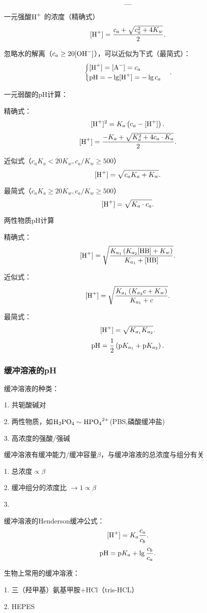 \[
    \ldots
.\] 
\begin{notation}
    一元强酸$\ce{H+}$ 的浓度（精确式）
    \[
        [\ce{H+}]=\frac{c_a+\sqrt{c_a^2+4K_w} }{2}
    .\] 

    忽略水的解离（$c_a\ge 20[\ce{OH-}]$），可以近似为下式（最简式）：
    \[
        \begin{cases}
            [\ce{H+}]=[\ce{A-}]=c_a\\
            \ce{pH}=-\lg [\ce{H+}]=-\lg c_a
        \end{cases}
    .\] 
\end{notation}
\begin{notation}
    一元弱酸的pH计算：

    精确式：\[
        [\ce{H+}]^2 = K_a\left( c_a-[\ce{H+}] \right) 
    .\] 
    \[
        [\ce{H+}]=\frac{-K_a+\sqrt{K_a^2+4c_a\cdot K_a} }{2}
    .\]

    近似式（$c_aK_a<20K_w, c_a/K_w\ge 500$）
    \[
        [\ce{H+}]=\sqrt{c_aK_a+K_w} 
    .\]

    最简式（$c_aK_a\ge 20K_w, c_a/K_w\ge 500$）
    \[
        [\ce{H+}]=\sqrt{K_a\cdot c_a} 
    .\] 
\end{notation}
\begin{notation}
    两性物质pH计算

    精确式：
    \[
        [\ce{H+}]=\sqrt{\frac{K_{a_1}\left( K_{a_2}[\ce{HB}]+K_w \right) }{K_{a_1}+[\ce{HB}]}} 
    .\] 
    
    近似式：
    \[
        [\ce{H+}]=\sqrt{\frac{K_{a_1}\left( K_{a_2}c+K_w \right) }{K_{a_1}+c}} 
    .\] 

    最简式：
    \[
        [\ce{H+}]=\sqrt{K_{a_1}K_{a_2}} 
    .\] 
    \[
        \ce{pH}=\frac{1}{2}\left( \text{p}K_{a_1}+\text{p}K_{a_2} \right) 
    .\] 
\end{notation}
\subsubsection{缓冲溶液的pH}%
\label{subsub:缓冲溶液的pH}
\begin{notation}
    缓冲溶液的种类：

    1. 共轭酸碱对

    2. 两性物质，如$\ce{H_2PO_4}\sim \ce{HPO_4^{2+}}$(PBS,磷酸缓冲盐)

    3. 高浓度的强酸/强碱
\end{notation}
\begin{notation}
    缓冲溶液有缓冲能力/缓冲容量$\beta$，与缓冲溶液的总浓度与组分有关

    1. 总浓度$\propto \beta$
    
    2. 缓冲组分的浓度比 $\to 1\propto \beta$ 

    3. 
\end{notation}
缓冲溶液的Henderson缓冲公式：
 \[
     [\ce{H+}]=K_a \frac{c_a}{c_b}
.\] 
\[
    \ce{pH}=\text{p}K_a+\lg \frac{c_b}{c_a}
.\] 
\begin{notation}
    生物上常用的缓冲溶液：

    1. 三（羟甲基）氨基甲胺+HCl（tris-HCL）
    
    2. HEPES
\end{notation}

